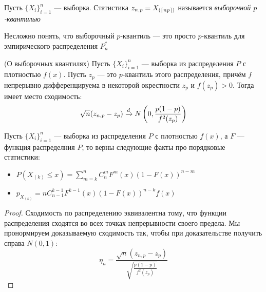 \begin{definition}
	Пусть $\{X_i\}_{i = 1}^n$ --- выборка. Статистика $z_{n, p} = X_{(\left\lceil np\right\rceil)}$ называется \textit{выборочной $p$-квантилью}
\end{definition}

\begin{note}
	Несложно понять, что выборочный $p$-квантиль --- это просто $p$-квантиль для эмпирического распределения $P_n^*$
\end{note}

\begin{theorem} (О выборочных квантилях)
	Пусть $\{X_i\}_{i = 1}^n$ --- выборка из распределения $P$ с плотностью $f(x)$. Пусть $z_p$ --- это $p$-квантиль этого распределения, причём $f$ непрерывно дифференцируема в некоторой окрестности $z_p$ и $f(z_p) > 0$. Тогда имеет место сходимость:
	\[
		\sqrt{n}(z_{n, p} - z_p) \xrightarrow{d} N\left(0, \frac{p(1 - p)}{f^2(z_p)}\right)
	\]
\end{theorem}

\begin{reminder}
	Пусть $\{X_i\}_{i = 1}^n$ --- выборка из распределения $P$ с плотностью $f(x)$, а $F$ --- функция распределния $P$, то верны следующие факты про порядковые статистики:
	\begin{itemize}
		\item $P(X_{(k)} \le x) = \sum_{m = k}^n C_n^m F^m(x)(1 - F(x))^{n - m}$
		
		\item $p_{X_{(k)}} = n C_{n - 1}^{k - 1} F^{k - 1}(x)(1 - F(x))^{n - k}f(x)$
	\end{itemize}
\end{reminder}

\begin{proof}
	Сходимость по распределению эквивалентна тому, что функции распределения сходятся во всех точках непрерывности своего предела. Мы пронормируем доказываемую сходимость так, чтобы при доказательстве получить справа $N(0, 1)$:
	\[
		\eta_n = \frac{\sqrt{n}(z_{n, p} - z_p)}{\sqrt{\frac{p(1 - p)}{f^2(z_p)}}}
	\]
\end{proof}